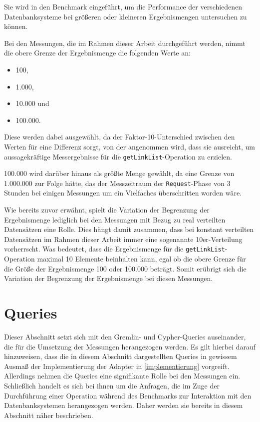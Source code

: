 Sie wird in den Benchmark eingeführt, um die Performance der verschiedenen Datenbanksysteme bei größeren oder kleineren Ergebnismengen untersuchen zu können.

Bei den Messungen, die im Rahmen dieser Arbeit durchgeführt werden, nimmt die obere Grenze der Ergebnismenge die folgenden Werte an:
\begin{itemize}
    \item 100,
    \item 1.000,
    \item 10.000 und
    \item 100.000. 
\end{itemize}
Diese werden dabei ausgewählt, da der Faktor-10-Unterschied zwischen den Werten für eine Differenz sorgt, von der angenommen wird, dass sie ausreicht, um aussagekräftige Messergebnisse für die \texttt{getLinkList}-Ope\-ra\-ti\-on zu erzielen. 

100.000 wird darüber hinaus als größte Menge gewählt, da eine Grenze von 1.000.000 zur Folge hätte, das der Messzeitraum der \texttt{Request}-Phase von 3 Stunden bei einigen Messungen um ein Vielfaches überschritten worden wäre.

Wie bereits zuvor erwähnt, spielt die Variation der Begrenzung der Ergebnismenge lediglich bei den Messungen mit Bezug zu real verteilten Datensätzen eine Rolle. Dies hängt damit zusammen, dass bei konstant verteilten Datensätzen im Rahmen dieser Arbeit immer eine sogenannte 10er-Verteilung vorherrscht. Was bedeutet, dass die Ergebnismenge für die \texttt{getLinkList}-Ope\-ra\-ti\-on maximal 10 Elemente beinhalten kann, egal ob die obere Grenze für die Größe der Ergebnismenge 100 oder 100.000 beträgt. Somit erübrigt sich die Variation der Begrenzung der Ergebnismenge bei diesen Messungen. 

\section{Queries}
\label{analyse:queries}
Dieser Abschnitt setzt sich mit den Gremlin- und Cypher-Queries auseinander, die für die Umsetzung der Messungen herangezogen werden. Es gilt hierbei darauf hinzuweisen, dass die in diesem Abschnitt dargestellten Queries in gewissem Ausmaß der Implementierung der Adapter in \autoref{implementierung} vorgreift. Allerdings nehmen die Queries eine signifikante Rolle bei den Messungen ein. Schließlich handelt es sich bei ihnen um die Anfragen, die im Zuge der Durchführung einer Operation während des Benchmarks zur Interaktion mit den Datenbanksystemen herangezogen werden. Daher werden sie bereits in diesem Abschnitt näher beschrieben.

